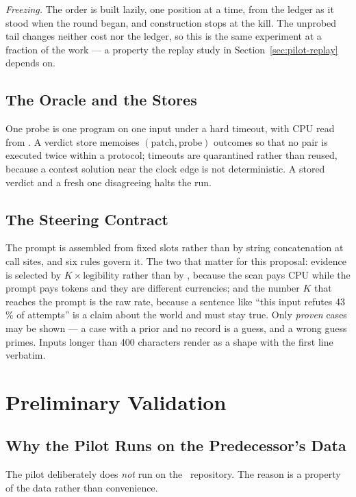 \emph{Freezing.} The order is built lazily, one position at a time, from the
ledger as it stood when the round began, and construction stops at the kill.
The unprobed tail changes neither cost nor the ledger, so this is the same
experiment at a fraction of the work --- a property the replay study in
Section~\ref{sec:pilot-replay} depends on.

\subsection{The Oracle and the Stores}

One probe is one program on one input under a hard timeout, with CPU read from
. A verdict store memoises $(\text{patch}, \text{probe})$
outcomes so that no pair is executed twice within a protocol; timeouts are
quarantined rather than reused, because a contest solution near the clock edge
is not deterministic. A stored verdict and a fresh one disagreeing halts the
run.

\subsection{The Steering Contract}
\label{sec:steer}

The prompt is assembled from fixed slots rather than by string concatenation at
call sites, and six rules govern it. The two that matter for this proposal:
evidence is selected by $K \times \text{legibility}$ rather than by \km,
because the scan pays CPU while the prompt pays tokens and they are different
currencies; and the number $K$ that reaches the prompt is the raw rate, because
a sentence like ``this input refutes 43\,\% of attempts'' is a claim about the
world and must stay true. Only \emph{proven} cases may be shown --- a case with
a prior and no record is a guess, and a wrong guess primes. Inputs longer than
400 characters render as a shape with the first line verbatim.

\section{Preliminary Validation}
\label{sec:pilot}

\subsection{Why the Pilot Runs on the Predecessor's Data}
\label{sec:why-pilot-here}

The pilot deliberately does \emph{not} run on the \caster\ repository. The
reason is a property of the data rather than convenience.

